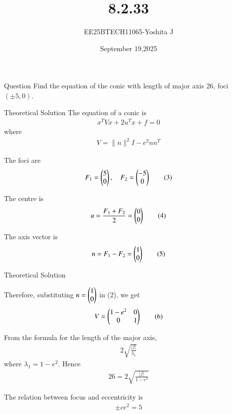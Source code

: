 \documentclass{beamer}
\begin{document}
\title 
{8.2.33}
\date{September 19,2025}


\author 
{EE25BTECH11065-Yoshita J}






\frame{\titlepage}
\begin{frame}{Question}
Find the equation of the conic with length of major axis 26, foci $(\pm 5, 0)$.

\end{frame}


\begin{frame}{Theoretical Solution}
The equation of a conic is
\begin{align}
x^T V x + 2u^T x + f = 0 \tag{1}
\end{align}
where
\begin{align}
V = \|n\|^2 I - e^2nn^T \tag{2}
\end{align}

The foci are
\begin{align}
F_1 = \begin{pmatrix}5\\0\end{pmatrix},\quad F_2 = \begin{pmatrix}-5\\0\end{pmatrix} \tag{3}
\end{align}

The centre is
\begin{align}
u = \frac{F_1+F_2}{2} = \begin{pmatrix}0\\0\end{pmatrix} \tag{4}
\end{align}

The axis vector is
\begin{align}
n = F_1-F_2 = \begin{pmatrix}1\\0\end{pmatrix} \tag{5}
\end{align}

\end{frame}

\begin{frame}{Theoretical Solution}

Therefore, substituting $n=\begin{pmatrix}1\\0\end{pmatrix}$ in (2), we get
\begin{align}
V = \begin{pmatrix}1-e^2 & 0 \\ 0 & 1\end{pmatrix} \tag{6}
\end{align}

From the formula for the length of the major axis,
\begin{align}
2\sqrt{\frac{|f|}{\lambda_1}} \tag{7}
\end{align}
where $\lambda_1 = 1-e^2$. Hence
\begin{align}
26 = 2\sqrt{\frac{|f|}{1-e^2}} \tag{8}
\end{align}

The relation between focus and eccentricity is
\begin{align}
\pm ce^2 = 5 \tag{9}
\end{align}

\end{frame}
\end{document}
